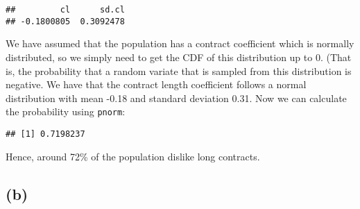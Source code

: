 \documentclass[
]{article}
\newenvironment{Shaded}{\begin{snugshade}}{\end{snugshade}}
\newcommand{\DecValTok}[1]{\textcolor[rgb]{0.00,0.00,0.81}{#1}}
\newcommand{\KeywordTok}[1]{\textcolor[rgb]{0.13,0.29,0.53}{\textbf{#1}}}
\newcommand{\NormalTok}[1]{#1}
\newcommand{\OperatorTok}[1]{\textcolor[rgb]{0.81,0.36,0.00}{\textbf{#1}}}
\newcommand{\StringTok}[1]{\textcolor[rgb]{0.31,0.60,0.02}{#1}}
\begin{document}
\begin{Shaded}
\end{Shaded}

\begin{verbatim}
##         cl      sd.cl 
## -0.1800805  0.3092478
\end{verbatim}

We have assumed that the population has a contract coefficient which is
normally distributed, so we simply need to get the CDF of this
distribution up to 0. (That is, the probability that a random variate
that is sampled from this distribution is negative. We have that the
contract length coefficient follows a normal distribution with mean
-0.18 and standard deviation 0.31. Now we can calculate the probability
using \texttt{pnorm}:

\begin{Shaded}
\end{Shaded}

\begin{verbatim}
## [1] 0.7198237
\end{verbatim}

Hence, around 72\% of the population dislike long contracts.

\hypertarget{b}{%
\subsection{(b)}\label{b}}
\end{document}
